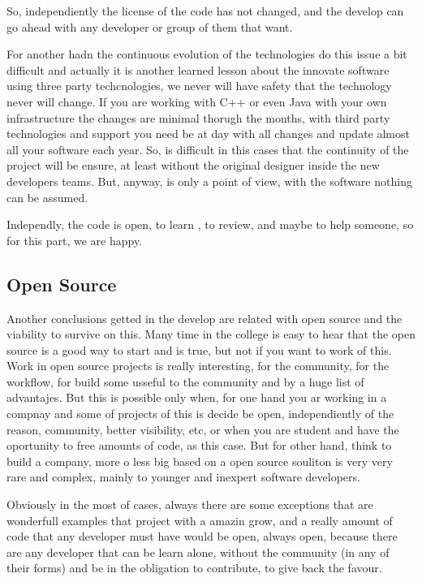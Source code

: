 So, independiently the license of the code has not changed, and the develop can
 go ahead with any developer or group of them that want.

For another hadn the continuous evolution of the technologies do this issue a
bit difficult and actually it is another learned lesson about the innovate
software using three party techcnologies, we never will have safety that the
technology never will change. If you are working with C++ or even Java with your
own infrastructure the changes are minimal thorugh the months, with third party
technologies and support you need be at day with all changes and update almost
all your software each year. So, is difficult in this cases that the continuity
of the project will be ensure, at least without the original designer inside the
new developers teams. But, anyway, is only a point of view, with the software
nothing can be assumed.

Independly, the code is open, to learn , to review, and maybe to help someone,
so for this part, we are happy.

\subsection{Open Source}

Another conclusions getted in the develop are related with open source and the
viability to survive on this. Many time in the college is easy to hear that the
open source is a good way to start and is true, but not if you want to work of
this. Work in open source projects is really interesting, for the community,
for the workflow, for build some usseful to the community and by a huge list of
advantajes. But this is possible only when, for one hand you ar working in a
compnay and some of projects of this is decide be open, independiently of the
reason, community, better visibility, etc, or when you are student and have
the oportunity to free amounts of code, as this case. But for other hand,
think to build a company, more o less big based on a open source souliton
is very very rare and complex, mainly to younger and inexpert  software developers.

Obviously in the most of cases, always there are some exceptions that are
wonderfull examples that project with a amazin grow, and a really amount of
code that any developer must have would be open, always open, because there
are any developer that can be learn alone, without the community (in any of their
forms) and be in the obligation to contribute, to give back the favour.
